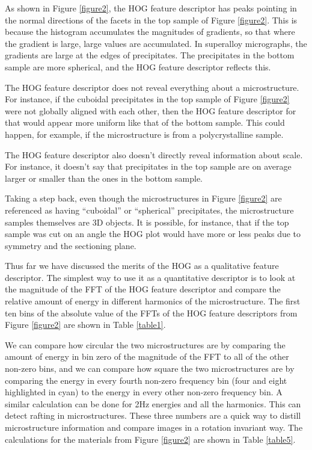 \documentclass[review]{elsarticle}
\begin{document}
	As shown in Figure \ref{figure2}, the HOG feature descriptor has peaks pointing in the normal directions of the facets in the top sample of Figure \ref{figure2}. This is because the histogram accumulates the magnitudes of gradients, so that where the gradient is large, large values are accumulated. In superalloy micrographs, the gradients are large at the edges of precipitates. The precipitates in the bottom sample are more spherical, and the HOG feature descriptor reflects this.
	
	The HOG feature descriptor does not reveal everything about a microstructure. For instance, if the cuboidal precipitates in the top sample of Figure \ref{figure2} were not globally aligned with each other, then the HOG feature descriptor for that would appear more uniform like that of the bottom sample. This could happen, for example, if the microstructure is from a polycrystalline sample.
	
	The HOG feature descriptor also doesn't directly reveal information about scale. For instance, it doesn't say that precipitates in the top sample are on average larger or smaller than the ones in the bottom sample.
	
	Taking a step back, even though the microstructures in Figure \ref{figure2} are referenced as having ``cuboidal'' or ``spherical'' precipitates, the microstructure samples themselves are 3D objects. It is possible, for instance, that if the top sample was cut on an angle the HOG plot would have more or less peaks due to symmetry and the sectioning plane.

	Thus far we have discussed the merits of the HOG as a qualitative feature descriptor. The simplest way to use it as a quantitative descriptor is to look at the magnitude of the FFT of the HOG feature descriptor and compare the relative amount of energy in different harmonics of the microstructure. The first ten bins of the absolute value of the FFTs of the HOG feature descriptors from Figure \ref{figure2} are shown in Table \ref{table1}.
	
  	We can compare how circular the two microstructures are by comparing the amount of energy in bin zero of the magnitude of the FFT to all of the other non-zero bins, and we can compare how square the two microstructures are by comparing the energy in every fourth non-zero frequency bin (four and eight highlighted in cyan) to the energy in every other non-zero frequency bin. A similar calculation can be done for 2Hz energies and all the harmonics. This can detect rafting in microstructures. These three numbers are a quick way to distill microstructure information and compare images in a rotation invariant way. The calculations for the materials from Figure \ref{figure2} are shown in Table \ref{table5}.
	
\end{document}
